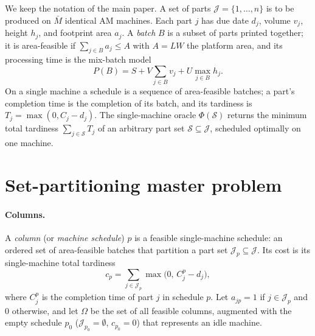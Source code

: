 \documentclass[review,3p,times,authoryear]{elsarticle}
\newcommand{\J}{\mathcal{J}}
\newcommand{\Om}{\Omega}
\newcommand{\Mbar}{\bar{M}}
\begin{document}
We keep the notation of the main paper. A set of parts $\J=\{1,\dots,n\}$ is to
be produced on $\Mbar$ identical AM machines. Each part $j$ has due date $d_j$,
volume $v_j$, height $h_j$, and footprint area $a_j$. A \emph{batch} $B$ is a
subset of parts printed together; it is area-feasible if $\sum_{j\in B}a_j\le A$
with $A=LW$ the platform area, and its processing time is the mix-batch model
\begin{equation}
P(B)=S+V\sum_{j\in B}v_j+U\max_{j\in B}h_j .
\label{eq:bp_batchtime}
\end{equation}
On a single machine a schedule is a sequence of area-feasible batches; a part's
completion time is the completion of its batch, and its tardiness is
$T_j=\max(0,C_j-d_j)$. The single-machine oracle $\Phi(\mathcal{S})$ returns the
minimum total tardiness $\sum_{j\in\mathcal{S}}T_j$ of an arbitrary part set
$\mathcal{S}\subseteq\J$, scheduled optimally on one machine.

\section{Set-partitioning master problem}
\label{sec:bp_master}

\paragraph{Columns.} A \emph{column} (or \emph{machine schedule}) $p$ is a
feasible single-machine schedule: an ordered set of area-feasible batches that
partition a part set $\J_p\subseteq\J$. Its cost is its single-machine total
tardiness
\begin{equation}
c_p=\sum_{j\in\J_p}\max\!\bigl(0,\,C^{p}_{j}-d_j\bigr),
\label{eq:bp_colcost}
\end{equation}
where $C^p_j$ is the completion time of part $j$ in schedule $p$. Let
$a_{jp}=1$ if $j\in\J_p$ and $0$ otherwise, and let $\Om$ be the set of all
feasible columns, augmented with the empty schedule $p_0$ ($\J_{p_0}=\emptyset$,
$c_{p_0}=0$) that represents an idle machine.
\end{document}
